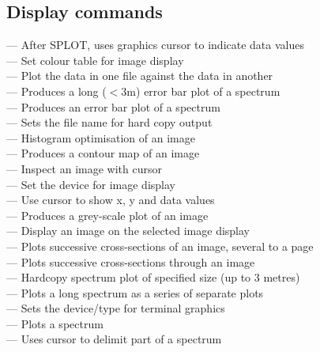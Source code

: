 
\subsection{\label{classifdisplay}Display commands}

 --- After SPLOT, uses graphics cursor to indicate data values\\
 --- Set colour table for image display\\
 --- Plot the data in one file against the data in another\\
 --- Produces a long ($<$3m) error bar plot of a spectrum\\
 --- Produces an error bar plot of a spectrum\\
 --- Sets the file name for hard copy output\\
 --- Histogram optimisation of an image\\
 --- Produces a contour map of an image\\
 --- Inspect an image with cursor\\
 --- Set the device for image display\\
 --- Use cursor to show x, y and data values\\
 --- Produces a grey-scale plot of an image\\
 --- Display an image on the selected image display\\
 --- Plots successive cross-sections of an image, several to a page\\
 --- Plots successive cross-sections through an image\\
 --- Hardcopy spectrum plot of specified size (up to 3 metres)\\
 --- Plots a long spectrum as a series of separate plots\\
 --- Sets the device/type for terminal graphics\\
 --- Plots a spectrum\\
 --- Uses cursor to delimit part of a spectrum

